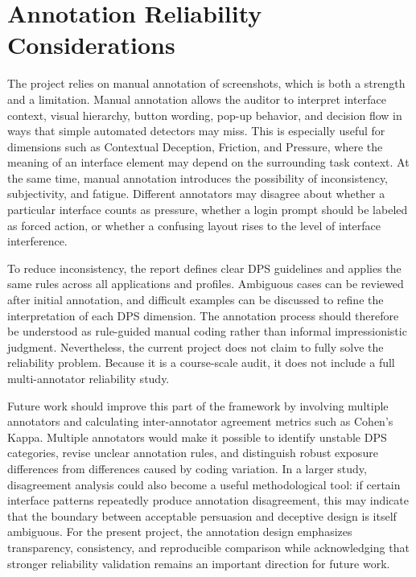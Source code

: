 \section{Annotation Reliability Considerations}
\label{subsec:annotation-reliability}

The project relies on manual annotation of screenshots, which is both a strength and a limitation. Manual annotation allows the auditor to interpret interface context, visual hierarchy, button wording, pop-up behavior, and decision flow in ways that simple automated detectors may miss. This is especially useful for dimensions such as Contextual Deception, Friction, and Pressure, where the meaning of an interface element may depend on the surrounding task context. At the same time, manual annotation introduces the possibility of inconsistency, subjectivity, and fatigue. Different annotators may disagree about whether a particular interface counts as pressure, whether a login prompt should be labeled as forced action, or whether a confusing layout rises to the level of interface interference.

To reduce inconsistency, the report defines clear DPS guidelines and applies the same rules across all applications and profiles. Ambiguous cases can be reviewed after initial annotation, and difficult examples can be discussed to refine the interpretation of each DPS dimension. The annotation process should therefore be understood as rule-guided manual coding rather than informal impressionistic judgment. Nevertheless, the current project does not claim to fully solve the reliability problem. Because it is a course-scale audit, it does not include a full multi-annotator reliability study.

Future work should improve this part of the framework by involving multiple annotators and calculating inter-annotator agreement metrics such as Cohen's Kappa. Multiple annotators would make it possible to identify unstable DPS categories, revise unclear annotation rules, and distinguish robust exposure differences from differences caused by coding variation. In a larger study, disagreement analysis could also become a useful methodological tool: if certain interface patterns repeatedly produce annotation disagreement, this may indicate that the boundary between acceptable persuasion and deceptive design is itself ambiguous. For the present project, the annotation design emphasizes transparency, consistency, and reproducible comparison while acknowledging that stronger reliability validation remains an important direction for future work.
